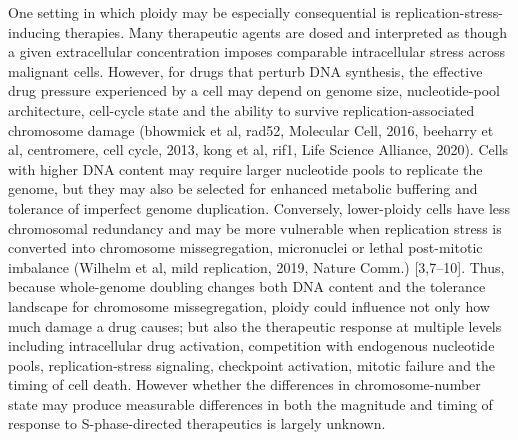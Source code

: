 \documentclass[11pt,notitlepage]{article}
\begin{document}
One setting in which ploidy may be especially consequential is replication-stress-inducing therapies. Many therapeutic agents are dosed and interpreted as though a given extracellular concentration imposes comparable intracellular stress across malignant cells. However, for drugs that perturb DNA synthesis, the effective drug pressure experienced by a cell may depend on genome size, nucleotide-pool architecture, cell-cycle state and the ability to survive replication-associated chromosome damage\cite{bhowmick_rad52_2016, beeharry_centromere_2013, kong_rif1_2023} (bhowmick et al, rad52, Molecular Cell, 2016, beeharry et al, centromere, cell cycle, 2013, kong et al, rif1, Life Science Alliance, 2020). Cells with higher DNA content may require larger nucleotide pools to replicate the genome, but they may also be selected for enhanced metabolic buffering and tolerance of imperfect genome duplication. Conversely, lower-ploidy cells have less chromosomal redundancy and may be more vulnerable when replication stress is converted into chromosome missegregation, micronuclei or lethal post-mitotic imbalance \cite{lopez_interplay_2020, santaguida_chromosome_2017, thompson_proliferation_2010, lee_effects_2016,wilhelm_mild_2019} (Wilhelm et al, mild replication,  2019, Nature Comm.) [3,7–10]. Thus, because whole-genome doubling changes both DNA content and the tolerance landscape for chromosome missegregation, ploidy could influence not only how much damage a drug causes; but also the therapeutic response at multiple levels including intracellular drug activation, competition with endogenous nucleotide pools, replication-stress signaling, checkpoint activation, mitotic failure and the timing of cell death. However whether the differences in chromosome-number state may produce measurable differences in both the magnitude and timing of response to S-phase-directed therapeutics is largely unknown.
\end{document}
